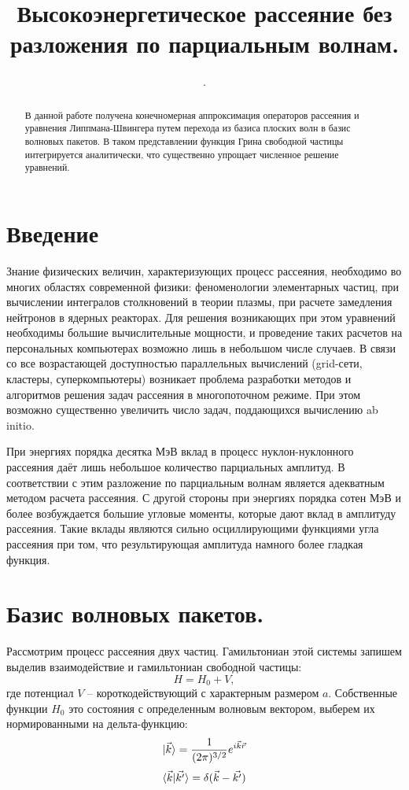 \documentclass[a4paper,12pt]{article}
\title{Высокоэнергетическое рассеяние без разложения по парциальным волнам.}
\author{.}
\begin{document}
	
	\tableofcontents
    \pagebreak
     
	\begin{abstract}
		В данной работе получена конечномерная аппроксимация операторов рассеяния и уравнения Липпмана-Швингера путем перехода из базиса плоских волн в базис волновых пакетов. В таком представлении функция Грина свободной частицы интегрируется аналитически, что существенно упрощает численное решение уравнений.
	\end{abstract}
	\pagebreak

	\section{Введение}
Знание физических величин, характеризующих процесс рассеяния, необходимо во многих областях современной физики: феноменологии элементарных частиц, при вычислении интегралов столкновений в теории плазмы, при расчете замедления нейтронов в ядерных реакторах. Для решения возникающих при этом уравнений необходимы большие вычислительные мощности, и проведение таких расчетов на персональных компьютерах возможно лишь в небольшом числе случаев. В связи со все возрастающей доступностью параллельных вычислений (grid-сети, кластеры, суперкомпьютеры) возникает проблема разработки методов и алгоритмов решения задач рассеяния в многопоточном режиме. При этом возможно существенно увеличить число задач, поддающихся вычислению ab initio.

При энергиях порядка десятка МэВ вклад в процесс нуклон-нуклонного рассеяния даёт лишь небольшое количество парциальных амплитуд. В соответствии с этим разложение по парциальным волнам является адекватным методом расчета рассеяния. С другой стороны при энергиях порядка сотен МэВ и более возбуждается большие угловые моменты, которые дают вклад в амплитуду рассеяния. Такие вклады являются сильно осциллирующими функциями угла рассеяния при том, что результирующая амплитуда намного более гладкая функция.


	\section{Базис волновых пакетов.}
Рассмотрим процесс рассеяния двух частиц. Гамильтониан этой системы запишем выделив взаимодействие и гамильтониан свободной частицы:
\[
	H = H_0 + V,
\]
где потенциал $V$ – короткодействующий с характерным размером $a$. Собственные функции $H_0$ это состояния с определенным волновым вектором, выберем их нормированными на дельта-функцию:
\[
	\ket{\vec{k}} = \frac{1}{(2\pi)^{3/2}}e^{i\vec{k}\vec{r}} 
\]\[
	\braket{\vec{k}|\vec{k'}} = \delta(\vec{k} - \vec{k'})
\]
\end{document}
